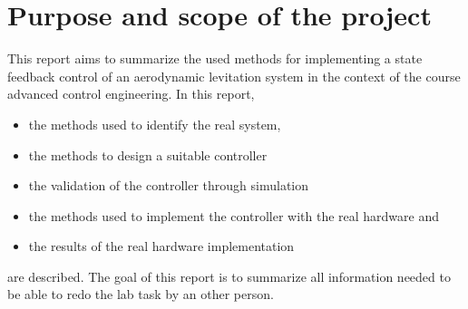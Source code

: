 \chapter{Purpose and scope of the project}
\label{chapter:purpose_and_scope}
This report aims to summarize the used methods for implementing a state feedback control of an aerodynamic levitation system in the context of the course advanced control engineering. In this report, 
\begin{itemize}
    \item the methods used to identify the real system,
    \item the methods to design a suitable controller
    \item the validation of the controller through simulation 
    \item the methods used to implement the controller with the real hardware and
    \item the results of the real hardware implementation
\end{itemize}
    are described. The goal of this report is to summarize all information needed to be able to redo the lab task by an other person. 

